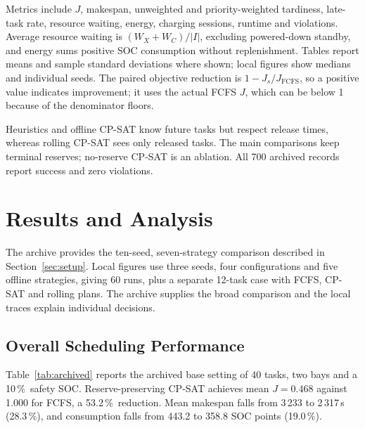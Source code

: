 \documentclass[11pt,a4paper]{article}
\newcommand{\pct}{\,\%}
\begin{document}
Metrics include $J$, makespan, unweighted and priority-weighted tardiness, late-task rate, resource
waiting, energy, charging sessions, runtime and violations. Average resource waiting is
$(W_X + W_C)/|I|$, excluding powered-down standby, and energy sums positive SOC consumption without
replenishment. Tables report means and sample standard deviations where shown; local figures show
medians and individual seeds. The paired objective reduction is $1 - J_s / J_{\text{FCFS}}$, so a
positive value indicates improvement; it uses the actual FCFS $J$, which can be below 1 because of the
denominator floors.

Heuristics and offline CP-SAT know future tasks but respect release times, whereas rolling CP-SAT sees
only released tasks. The main comparisons keep terminal reserves; no-reserve CP-SAT is an ablation.
All 700 archived records report success and zero violations.

\section{Results and Analysis}
\label{sec:results}

The archive provides the ten-seed, seven-strategy comparison described in Section~\ref{sec:setup}.
Local figures use three seeds, four configurations and five offline strategies, giving 60 runs, plus a
separate 12-task case with FCFS, CP-SAT and rolling plans. The archive supplies the broad comparison
and the local traces explain individual decisions.

\subsection{Overall Scheduling Performance}

Table~\ref{tab:archived} reports the archived base setting of 40 tasks, two bays and a 10\pct\ safety
SOC. Reserve-preserving CP-SAT achieves mean $J = 0.468$ against 1.000 for FCFS, a 53.2\pct\
reduction. Mean makespan falls from 3\,233 to 2\,317\,s (28.3\pct), and consumption falls from 443.2 to
358.8 SOC points (19.0\pct).
\end{document}

